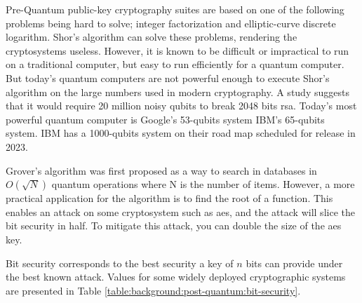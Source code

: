 Pre-Quantum public-key cryptography suites are based on one of the following problems being hard to solve; integer factorization and elliptic-curve discrete logarithm. Shor's algorithm can solve these problems, rendering the cryptosystems useless\cite{shor1997}. However, it is known to be difficult or impractical to run on a traditional computer, but easy to run efficiently for a quantum computer. But today's quantum computers are not powerful enough to execute Shor's algorithm on the large numbers used in modern cryptography\cite{bernstein2017}. A study \cite{gidney2019} suggests that it would require 20 million noisy \glspl{qubit} to break 2048 bits \gls{rsa}. Today's most powerful quantum computer is Google's 53-\glspl{qubit} system\cite{google2019:quantum-computer} IBM's 65-\glspl{qubit} system\cite{ibm2020:quantum-computer}. IBM has a 1000-\glspl{qubit} system on their road map scheduled for release in 2023\cite{ibm2020:quantum-computer}.

Grover's algorithm was first proposed as a way to search in databases in $O(\sqrt N)$ quantum operations where N is the number of items\cite{grover1996}. However, a more practical application for the algorithm is to find the root of a function\cite{bernstein2017}. This enables an attack on some cryptosystem such as \gls{aes}, and the attack will slice the bit security in half. To mitigate this attack, you can double the size of the \gls{aes} key.


Bit security corresponds to the best security a key of $n$ bits can provide under the best known attack. Values for some widely deployed cryptographic systems are presented in Table \ref{table:background:post-quantum:bit-security}.

